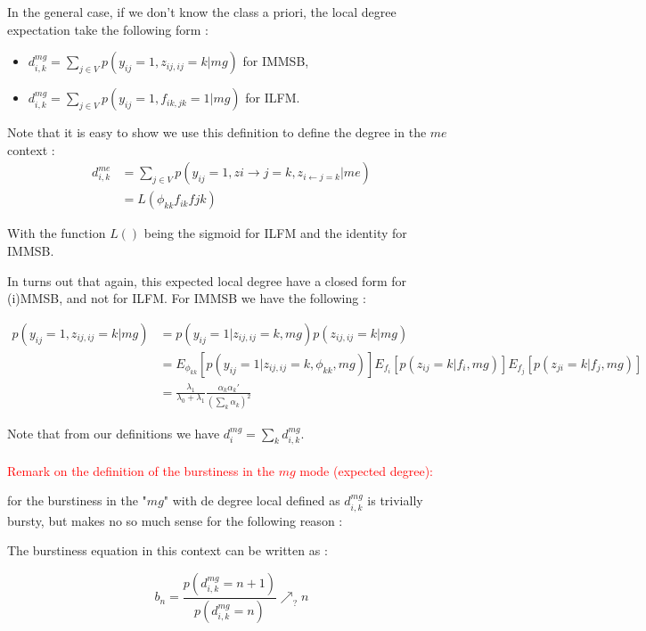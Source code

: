 In the general case, if we don't know the class a priori, the local degree expectation take the following form :

\begin{itemize}
\item  $d_{i,k}^{mg} = \sum_{j\in V} p(y_{ij}=1, z_{ij, ij}=k | mg)$ for IMMSB,
\item  $d_{i,k}^{mg} = \sum_{j\in V} p(y_{ij}=1, f_{ik, jk}=1| mg)$ for ILFM.
\end{itemize}

Note that it is easy to show we use this definition to define the degree in the $me$ context :
\begin{align*}
 d_{i,k}^{me} &= \sum_{j\in V} p(y_{ij}=1, z{i\rightarrow j}=k, z_{i\leftarrow j =k} | me) \\
  &= L(\phi_{kk} f_{ik} f{jk})
 \end{align*}
 
With the function $L()$ being the sigmoid for ILFM and the identity for IMMSB.

In turns out that again, this expected local degree have a closed form for (i)MMSB, and not for ILFM. For IMMSB we have the following :

\begin{align*}
p(y_{ij}=1, z_{ij, ij}=k | mg) &= p(y_{ij}=1 |  z_{ij, ij}=k, mg) p( z_{ij, ij}=k | mg) \\
 &=E_{\phi_{kk}}[ p(y_{ij}=1 |  z_{ij, ij}=k, \phi_{kk}, mg) ] E_{f_i}[ p( z_{ij}=k | f_i, mg)] E_{f_j}[ p( z_{ji}=k | f_j, mg)] \\
 &= \frac{\lambda_1}{\lambda_0+\lambda_1}\frac{ \alpha_k\alpha_k'}{ (\sum_k \alpha_k)^2}
\end{align*}

Note that from our definitions we have $d_i^{mg} = \sum_k d_{i,k}^{mg}$.


\paragraph{}
\textcolor{red}{Remark on the definition of the burstiness in the $mg$ mode (expected degree):
\hrulefill
\hrulefill
~\\
}

for the burstiness in the "$mg$" with de degree local defined as $d_{i,k}^{mg}$  is trivially bursty, but makes no so much sense for the following reason :

The burstiness equation in this context can be written as :

\begin{equation}
b_n = \frac{p(d_{i,k}^{mg} = n+1)}{p(d_{i,k}^{mg} = n)}  \nearrow_? n 
\end{equation}

